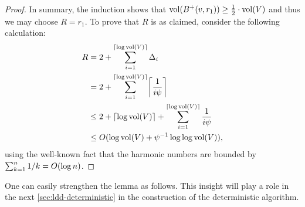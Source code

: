 \documentclass[letterpaper,11pt]{article}
\begin{document}
\begin{proof}
In summary, the induction shows that $\operatorname{vol}(B^+(v, r_1)) \geq \frac{1}{2} \cdot \operatorname{vol}(V)$ and thus we may choose $R = r_1$. To prove that $R$ is as claimed, consider the following calculation:
\begin{align*}
	R &= 2 + \sum_{i=1}^{\ceil{\log \vol(V)}} \Delta_i \\
	&= 2 + \sum_{i=1}^{\ceil{\log \vol(V)}} \ceil*{\frac{1}{i \psi}} \\
	&\leq 2 + \ceil{\log \vol(V)} + \sum_{i=1}^{\ceil{\log \vol(V)}} \frac{1}{i \psi} \\
	&\leq \Order(\log\vol(V) + \psi^{-1} \log\log\vol(V)),
\end{align*}
using the well-known fact that the harmonic numbers are bounded by $\sum_{k=1}^n 1/k = O(\log n)$.
\end{proof}

One can easily strengthen the lemma as follows. This insight will play a role in the next \cref{sec:ldd-deterministic} in the construction of the deterministic algorithm.
\end{document}
